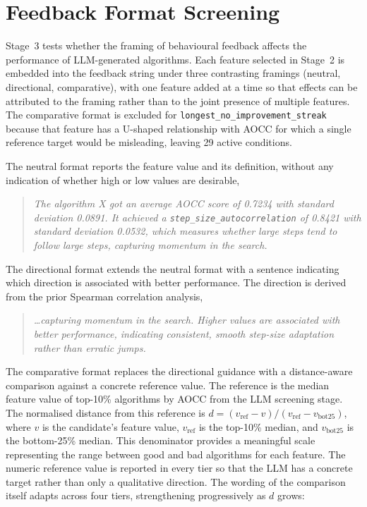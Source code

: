 \section{Feedback Format Screening}
\label{sec:meth-feedback-screening}

Stage~3 tests whether the framing of behavioural feedback affects the performance of LLM-generated algorithms. Each feature selected in Stage~2 is embedded into the feedback string under three contrasting framings (neutral, directional, comparative), with one feature added at a time so that effects can be attributed to the framing rather than to the joint presence of multiple features. The comparative format is excluded for \texttt{longest\_no\_improvement\_streak} because that feature has a U-shaped relationship with AOCC for which a single reference target would be misleading, leaving 29 active conditions.

The neutral format reports the feature value and its definition, without any indication of whether high or low values are desirable,

\begin{quote}
\small\itshape
The algorithm X got an average AOCC score of 0.7234 with standard deviation 0.0891. It achieved a \texttt{step\_size\_autocorrelation} of 0.8421 with standard deviation 0.0532, which measures whether large steps tend to follow large steps, capturing momentum in the search.
\end{quote}

The directional format extends the neutral format with a sentence indicating which direction is associated with better performance. The direction is derived from the prior Spearman correlation analysis,

\begin{quote}
\small\itshape
\ldots capturing momentum in the search. Higher values are associated with better performance, indicating consistent, smooth step-size adaptation rather than erratic jumps.
\end{quote}

The comparative format replaces the directional guidance with a distance-aware comparison against a concrete reference value. The reference is the median feature value of top-10\% algorithms by AOCC from the LLM screening stage. The normalised distance from this reference is $d = (v_{\text{ref}} - v) / (v_{\text{ref}} - v_{\text{bot25}})$, where $v$ is the candidate's feature value, $v_{\text{ref}}$ is the top-10\% median, and $v_{\text{bot25}}$ is the bottom-25\% median. This denominator provides a meaningful scale representing the range between good and bad algorithms for each feature. The numeric reference value is reported in every tier so that the LLM has a concrete target rather than only a qualitative direction. The wording of the comparison itself adapts across four tiers, strengthening progressively as $d$ grows:

